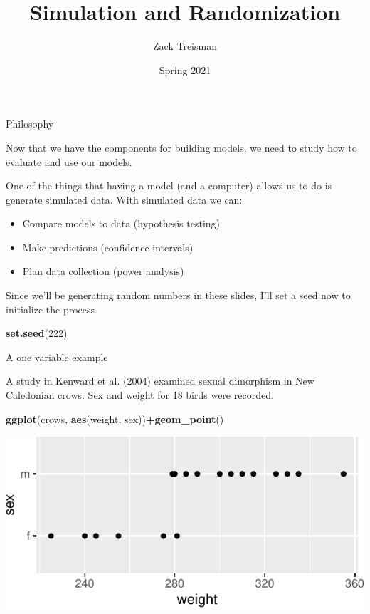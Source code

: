 \documentclass[
  ignorenonframetext,
]{beamer}
\title{Simulation and Randomization}
\author{Zack Treisman}
\date{Spring 2021}
\newenvironment{Shaded}{\begin{snugshade}}{\end{snugshade}}
\newcommand{\DecValTok}[1]{\textcolor[rgb]{0.00,0.00,0.81}{#1}}
\newcommand{\KeywordTok}[1]{\textcolor[rgb]{0.13,0.29,0.53}{\textbf{#1}}}
\newcommand{\NormalTok}[1]{#1}
\newcommand{\OperatorTok}[1]{\textcolor[rgb]{0.81,0.36,0.00}{\textbf{#1}}}
\providecommand{\tightlist}{%
  \setlength{\itemsep}{0pt}\setlength{\parskip}{0pt}}
\begin{document}
\frame{\titlepage}

\begin{frame}[fragile]{Philosophy}
\protect\hypertarget{philosophy}{}

Now that we have the components for building models, we need to study
how to evaluate and use our models.

One of the things that having a model (and a computer) allows us to do
is generate simulated data. With simulated data we can:

\begin{itemize}
\tightlist
\item
  Compare models to data (hypothesis testing)
\item
  Make predictions (confidence intervals)
\item
  Plan data collection (power analysis)
\end{itemize}

Since we'll be generating random numbers in these slides, I'll set a
seed now to initialize the process.

\begin{Shaded}
\begin{Highlighting}[]
\KeywordTok{set.seed}\NormalTok{(}\DecValTok{222}\NormalTok{)}
\end{Highlighting}
\end{Shaded}

\end{frame}

\begin{frame}[fragile]{A one variable example}
\protect\hypertarget{a-one-variable-example}{}

A study in Kenward et al. (2004) examined sexual dimorphism in New
Caledonian crows. Sex and weight for 18 birds were recorded.

\begin{Shaded}
\begin{Highlighting}[]
\KeywordTok{ggplot}\NormalTok{(crows, }\KeywordTok{aes}\NormalTok{(weight, sex))}\OperatorTok{+}\KeywordTok{geom_point}\NormalTok{()}
\end{Highlighting}
\end{Shaded}

\includegraphics{simulation_files/figure-beamer/unnamed-chunk-4-1.pdf}

\end{frame}
\end{document}
